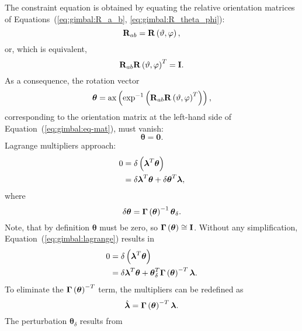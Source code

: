 \documentclass[10pt,dvips,fleqn,subeqn]{report}
\newcommand{\T}[1]{\bm{\mathbf{#1}}}
\begin{document}
\noindent
The constraint equation is obtained by equating the relative orientation
matrices of Equations~(\ref{eq:gimbal:R_a_b}, \ref{eq:gimbal:R_theta_phi}):
\begin{equation}
	\T{R}_{ab} = \T{R}\plbr{\vartheta, \varphi} ,
\end{equation}
or, which is equivalent,
\begin{equation}
	\T{R}_{ab} \T{R}\plbr{\vartheta, \varphi}^T = \T{I} .
	\label{eq:gimbal:eq-mat}
\end{equation}
As a consequence, the rotation vector
\begin{equation}
	\T{\theta} = \llk{ax}\plbr{\llk{exp}^{-1}\plbr{
		\T{R}_{ab} \T{R}\plbr{\vartheta, \varphi}^T
	}} ,
\end{equation}
corresponding to the orientation matrix at the left-hand side
of Equation~(\ref{eq:gimbal:eq-mat}),
must vanish:
\begin{equation}
	\T{\theta} = \T{0} .
	\label{eq:GIMBAL-CONSTRAINT}
\end{equation}
Lagrange multipliers approach:
\begin{align}
	0 &= \delta\plbr{\T{\lambda}^T \T{\theta}} \nonumber \\
	&= \delta\T{\lambda}^T \T{\theta} + \delta\T{\theta}^T \T{\lambda} ,
	\label{eq:gimbal:lagrange}
\end{align}
where
\begin{equation}
	\delta\T{\theta}
	= \T{\Gamma}\plbr{\T{\theta}}^{-1} \T{\theta}_{\delta} .
\end{equation}
Note, that by definition $\T{\theta}$ must be zero,
so $\T{\Gamma}\plbr{\T{\theta}}\cong\T{I}$.
Without any simplification, Equation~(\ref{eq:gimbal:lagrange}) results in
\begin{subequations}
\begin{align}
	0 &= \delta\plbr{\T{\lambda}^T \T{\theta}} \\
	&= \delta\T{\lambda}^T \T{\theta}
	+ \T{\theta}_{\delta}^T \T{\Gamma}\plbr{\T{\theta}}^{-T}\T{\lambda} .
\end{align}
\end{subequations}
To eliminate the $\T{\Gamma}\plbr{\T{\theta}}^{-T}$ term,
the multipliers can be redefined as 
\begin{equation}
	\hat{\T{\lambda}} = \T{\Gamma}\plbr{\T{\theta}}^{-T} \T{\lambda} .
\end{equation}
The perturbation $\T{\theta}_{\delta}$ results from
\end{document}
